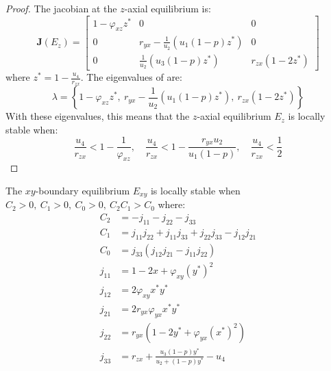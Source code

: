 \begin{proof}
    The jacobian at the $z$-axial equilibrium is:
    \begin{equation}\label{matrix:jacobian-axial-z}
        \textbf{J}\left(E_z\right) = \begin{bmatrix}
            1-\varphi_{xz}z^* & 0 & 0\\
            0 & r_{yx}-\frac{1}{u_2}\left(u_1\left(1-p\right)z^*\right) & 0\\
            0 & \frac{1}{u_2}\left(u_3\left(1-p\right)z^*\right) & r_{zx}\left(1-2z^*\right)
        \end{bmatrix}
    \end{equation}
    where $z^*=1-\frac{u_4}{r_{zx}}$.
    The eigenvalues of  are:
    \begin{equation*}
        \lambda=\left\{1-\varphi_{xz}z^*,\ r_{yx}-\frac{1}{u_2}\left(u_1\left(1-p\right)z^*\right),\ r_{zx}\left(1-2z^*\right)\right\}
    \end{equation*}
    With these eigenvalues, this means that the $z$-axial equilibrium $E_z$ is locally stable when:
    \begin{equation*}
        \frac{u_4}{r_{zx}} < 1-\frac{1}{\varphi_{xz}},\quad
        \frac{u_4}{r_{zx}} < 1-\frac{r_{yx}u_2}{u_1\left(1-p\right)},\quad
        \frac{u_4}{r_{zx}} < \frac{1}{2}
    \end{equation*}
\end{proof}
\begin{theorem}\label{thm:boundary-xy-stability}
    The $xy$-boundary equilibrium $E_{xy}$ is locally stable when $C_2>0,\ C_1>0,\ C_0>0,\ C_2C_1>C_0$ where:
    \begin{align*}
        C_2 &= -j_{11}-j_{22}-j_{33}\\
        C_1 &= j_{11}j_{22}+j_{11}j_{33}+j_{22}j_{33}-j_{12}j_{21}\\
        C_0 &= j_{33}\left(j_{12}j_{21}-j_{11}j_{22}\right)\\
        j_{11} &= 1-2x+\varphi_{xy}\left(y^*\right)^2\\
        j_{12} &= 2\varphi_{xy}x^*y^*\\
        j_{21} &= 2r_{yx}\varphi_{yx}x^*y^*\\
        j_{22} &= r_{yx}\left(1-2y^*+\varphi_{yx}\left(x^*\right)^2\right)\\
        j_{33} &= r_{zx}+\frac{u_3\left(1-p\right)y^*}{u_2+\left(1-p\right)y^*}-u_4
    \end{align*}
\end{theorem}
